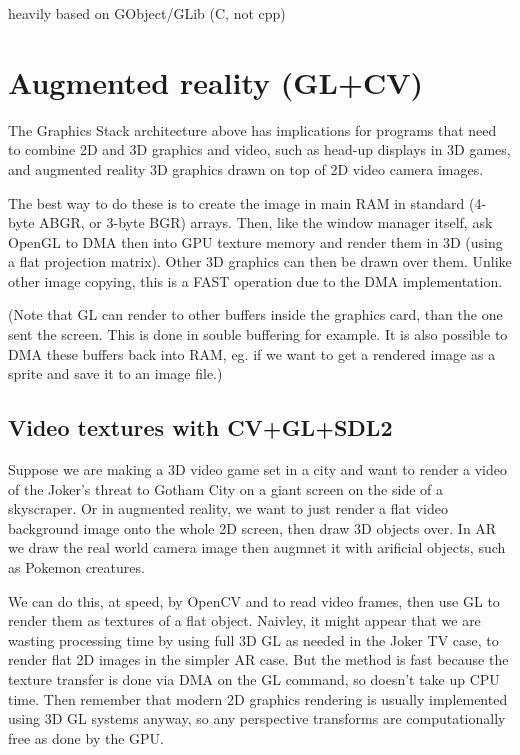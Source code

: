 \documentclass[oneside,english]{scrbook}
\begin{document}
heavily based on GObject/GLib (C, not cpp)


\chapter{Augmented reality (GL+CV)}

The Graphics Stack architecture above has implications for programs that need to combine 2D and 3D graphics and video, such as head-up displays in 3D games, and augmented reality 3D graphics drawn on top of 2D video camera images.

The best way to do these is to create the image in main RAM in standard (4-byte ABGR, or 3-byte BGR) arrays. Then, like the window manager itself, ask OpenGL to DMA then into GPU texture memory and render them in 3D (using a flat projection matrix). Other 3D graphics can then be drawn over them.  Unlike other image copying, this is a FAST operation due to the DMA implementation.

(Note that GL can render to other buffers inside the graphics card, than the one sent the screen. This is done in souble buffering for example. It is also possible to DMA these buffers back into RAM, eg. if we want to get a rendered image as a sprite and save it to an image file.)

\section{Video textures with CV+GL+SDL2}

Suppose we are making a 3D video game set in a city and want to render a video of the Joker's threat to Gotham City on a giant screen on the side of a skyscraper.  Or in augmented reality, we want to just render a flat video background image onto the whole 2D screen, then draw 3D objects over.  In AR we draw the real world camera image then augmnet it with arificial objects, such as Pokemon creatures.   

We can do this, at speed, by OpenCV and to read video frames, then use GL to render them as textures of a flat object.  Naivley, it might appear that we are wasting processing time by using full 3D GL as needed in the Joker TV case, to render flat 2D images in the simpler AR case.  But the method is fast because the texture transfer is done via DMA on the GL command, so doesn't take up CPU time.  Then remember that modern 2D graphics rendering is usually implemented using 3D GL systems anyway, so any perspective transforms are computationally free as done by the GPU.
\end{document}
